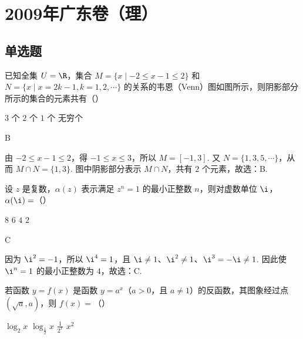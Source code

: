 \chapter{2009年广东卷（理）}

\section{单选题}

\begin{problem}
已知全集 \(U = \R\)，集合 \(M = \{x \mid -2 \leqslant x - 1 \leqslant 2\}\) 和 \(N = \{x \mid x = 2k - 1, k = 1, 2, \cdots\}\) 的关系的韦恩（Venn）图如图所示，则阴影部分所示的集合的元素共有（\quad）


\choices
    {\(3\text{ 个}\)}
    {\(2\text{ 个}\)}
    {\(1\text{ 个}\)}
    {\(\text{无穷个}\)}
\end{problem}

\begin{answer}
B
\end{answer}

\begin{solution}
由 \(-2\leqslant x-1\leqslant2\)，得 \(-1\leqslant x\leqslant3\)，所以 \(M=[-1,3]\). 又 \(N=\{1,3,5,\cdots\}\)，从而 \(M\cap N=\{1,3\}\). 图中阴影部分表示 \(M\cap N\)，共有 \(2\) 个元素，故选：B.
\end{solution}

\begin{problem}
设 \(z\) 是复数，\(\alpha(z)\) 表示满足 \(z^n = 1\) 的最小正整数 \(n\)，则对虚数单位 \(\i\)，\(\alpha(\i) =\)（\quad）

\choices
    {\(8\)}
    {\(6\)}
    {\(4\)}
    {\(2\)}
\end{problem}

\begin{answer}
C
\end{answer}

\begin{solution}
因为 \(\i^2=-1\)，所以 \(\i^4=1\)，且 \(\i\neq1\)、\(\i^2\neq1\)、\(\i^3=-\i\neq1\). 因此使 \(\i^n=1\) 的最小正整数为 \(4\)，故选：C.
\end{solution}

\begin{problem}
若函数 \(y = f(x)\) 是函数 \(y = a^x\)（\(a > 0\)，且 \(a \neq 1\)）的反函数，其图象经过点 \((\sqrt{a}, a)\)，则 \(f(x) =\)（\quad）

\choices
    {\(\log_2 x\)}
    {\(\log_{\frac{1}{2}}x\)}
    {\(\frac{1}{2^x}\)}
    {\(x^{2}\)}
\end{problem}

